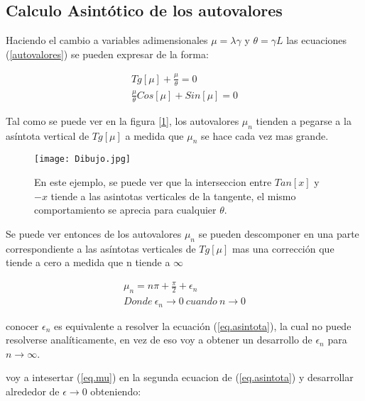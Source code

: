 \subsection{Calculo Asintótico de los autovalores}


Haciendo el cambio a variables adimensionales $\mu = \lambda \gamma $ y $\theta = \gamma L $ las ecuaciones (\ref{autovalores}) se pueden expresar de la forma:

\begin{equation}
\begin{array}{c}
    Tg[\mu] + \frac{\mu}{\theta} = 0 \\
    \frac{\mu}{\theta} Cos[\mu] + Sin[\mu] = 0
\end{array}
\label{eq.asintota}
\end{equation}

Tal como se puede ver en la figura [\ref{fig:Dibujo}], los autovalores $\mu _n$ tienden a pegarse a la asíntota vertical de $ Tg [ \mu ] $ a medida que $\mu _n$ se hace cada vez mas grande.

\begin{figure}
    \centering
    \texttt{[image: Dibujo.jpg]}
    \caption{En este ejemplo, se puede ver que la interseccion entre $Tan[x]$ y $-x$ tiende a las asintotas verticales de la tangente, el mismo comportamiento se aprecia para cualquier $ \theta $.}
    \label{fig:Dibujo}
\end{figure}

Se puede ver entonces de los autovalores $\mu _n$ se pueden descomponer en una parte correspondiente a las asíntotas verticales de $Tg[\mu]$ mas una corrección que tiende a cero a medida que n tiende a $\infty$

\begin{equation}
\begin{array}{c}
    \mu _n = n \pi + \frac{\pi}{2} + \epsilon _n \\
    Donde \ \epsilon _n \rightarrow{0}  \ cuando \ n \rightarrow{0}
\end{array}
\label{eq.mu}
\end{equation}


conocer $\epsilon _n $ es equivalente a resolver la ecuación (\ref{eq.asintota}), la cual no puede resolverse analíticamente, en vez de eso voy a obtener un desarrollo de $\epsilon _n $ para $n \rightarrow \infty$.

voy a intesertar (\ref{eq.mu}) en la segunda ecuacion de (\ref{eq.asintota}) y desarrollar alrededor de $\epsilon \rightarrow{0}$ obteniendo:

